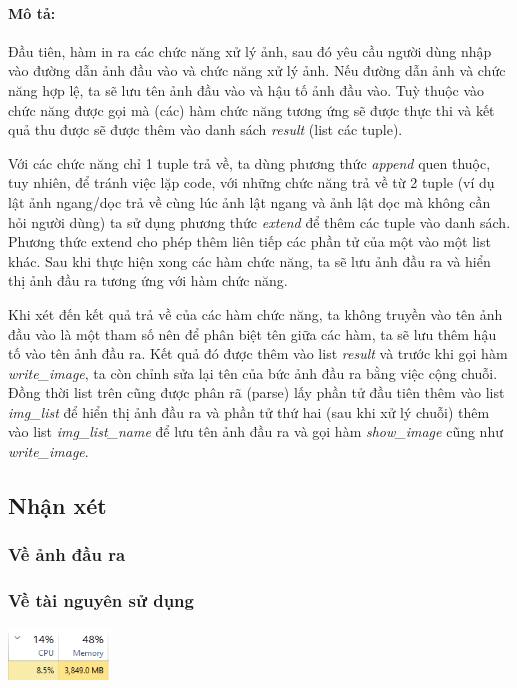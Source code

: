 \documentclass{article}
\begin{document}
\paragraph{Mô tả:} Đầu tiên, hàm in ra các chức năng xử lý ảnh, sau đó yêu cầu người dùng nhập vào đường dẫn ảnh đầu vào và chức năng xử lý ảnh. Nếu đường dẫn ảnh và chức năng hợp lệ, ta sẽ lưu tên ảnh đầu vào và hậu tố ảnh đầu vào. Tuỳ thuộc vào chức năng được gọi mà (các) hàm chức năng tương ứng sẽ được thực thi và kết quả thu được sẽ được thêm vào danh sách \textit{result} (list các tuple). \par
Với các chức năng chỉ 1 tuple trả về, ta dùng phương thức \textit{append} quen thuộc, tuy nhiên, để tránh việc lặp code, với những chức năng trả về từ 2 tuple (ví dụ lật ảnh ngang/dọc trả về cùng lúc ảnh lật ngang và ảnh lật dọc mà không cần hỏi người dùng) ta sử dụng phương thức \textit{extend} để thêm các tuple vào danh sách. Phương thức extend cho phép thêm liên tiếp các phần tử của một vào một list khác. Sau khi thực hiện xong các hàm chức năng, ta sẽ lưu ảnh đầu ra và hiển thị ảnh đầu ra tương ứng với hàm chức năng. \par
Khi xét đến kết quả trả về của các hàm chức năng, ta không truyền vào tên ảnh đầu vào là một tham số nên để phân biệt tên giữa các hàm, ta sẽ lưu thêm hậu tố vào tên ảnh đầu ra. Kết quả đó được thêm vào list \textit{result} và trước khi gọi hàm \textit{write\_image}, ta còn chỉnh sửa lại tên của bức ảnh đầu ra bằng việc cộng chuỗi. Đồng thời list trên cũng được phân rã (parse) lấy phần tử đầu tiên thêm vào list \textit{img\_list} để hiển thị ảnh đầu ra và phần tử thứ hai (sau khi xử lý chuỗi) thêm vào list \textit{img\_list\_name} để lưu tên ảnh đầu ra và gọi hàm \textit{show\_image} cũng như \textit{write\_image}.
\subsection{Nhận xét}
\subsubsection{Về ảnh đầu ra}

\subsubsection{Về tài nguyên sử dụng}

\centerline{\includegraphics[width=0.2\textwidth]{image/performance.png}}
\newpage
\end{document}
